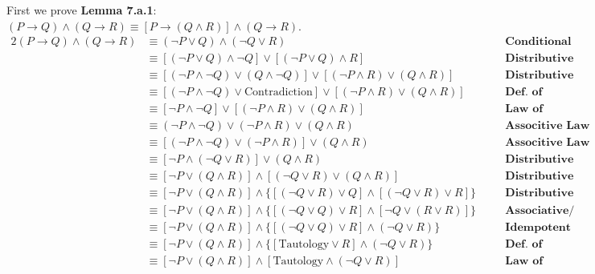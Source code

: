 \begin{enumerate}[label=(\alph*)]
    First we prove \textbf{Lemma 7.a.1}: $(P \rightarrow Q) \wedge (Q \rightarrow R) \equiv [P \rightarrow (Q \wedge R)] \wedge (Q \rightarrow R)$.
    \begin{alignat*}{2}
        (P \rightarrow Q) \wedge (Q \rightarrow R) &\equiv (\neg P \vee Q) \wedge (\neg Q \vee R) && \quad \textbf{Conditional Law}\\
        &\equiv [(\neg P \vee Q) \wedge \neg Q ]\vee [(\neg P \vee Q) \wedge R] && \quad \textbf{Distributive Law}\\
        &\equiv [(\neg P \wedge \neg Q) \vee (Q \wedge \neg Q)]\vee [(\neg P \wedge R) \vee (Q \wedge R)] && \quad \textbf{Distributive Law}\\
        &\equiv [(\neg P \wedge \neg Q) \vee \text{Contradiction}]\vee [(\neg P \wedge R) \vee (Q \wedge R)] && \quad \textbf{Def. of Contradiction}\\
        &\equiv [\neg P \wedge \neg Q]\vee [(\neg P \wedge R) \vee (Q \wedge R)] && \quad \textbf{Law of Contradiction}\\
        &\equiv (\neg P \wedge \neg Q) \vee (\neg P \wedge R) \vee (Q \wedge R) && \quad \textbf{Associtive Law}\\
        &\equiv [(\neg P \wedge \neg Q) \vee (\neg P \wedge R)] \vee (Q \wedge R) && \quad \textbf{Associtive Law}\\
        &\equiv [\neg P \wedge (\neg Q \vee R)] \vee (Q \wedge R) && \quad \textbf{Distributive Law}\\
        &\equiv [\neg P \vee (Q \wedge R)] \wedge [(\neg Q \vee R) \vee (Q \wedge R)] && \quad \textbf{Distributive Law}\\
        &\equiv [\neg P \vee (Q \wedge R)] \wedge \{[(\neg Q \vee R) \vee Q] \wedge [(\neg Q \vee R) \vee R]\} && \quad \textbf{Distributive Law}\\
        &\equiv [\neg P \vee (Q \wedge R)] \wedge \{[(\neg Q \vee Q) \vee R] \wedge [\neg Q \vee (R \vee R)]\} && \quad \textbf{Associative/Commutative Laws}\\
        &\equiv [\neg P \vee (Q \wedge R)] \wedge \{[(\neg Q \vee Q) \vee R] \wedge (\neg Q \vee R)\} && \quad \textbf{Idempotent Law}\\
        &\equiv [\neg P \vee (Q \wedge R)] \wedge \{[\text{Tautology} \vee R] \wedge (\neg Q \vee R)\} && \quad \textbf{Def. of Tautology}\\
        &\equiv [\neg P \vee (Q \wedge R)] \wedge [\text{Tautology} \wedge (\neg Q \vee R)] && \quad \textbf{Law of Tautology}\\

\end{alignat*}
\end{enumerate}
